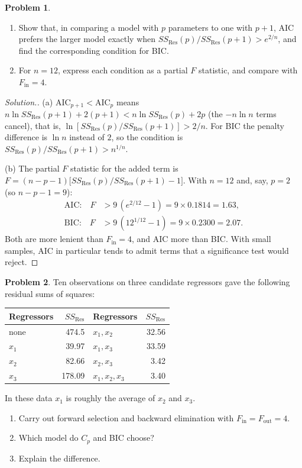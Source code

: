 \documentclass[11pt,a4paper]{article}
\numberwithin{equation}{section}
\theoremstyle{definition}
\newtheorem{problemx}{Problem}[subsection]
\newenvironment{problem}{\begin{problemx}}{\end{problemx}}
\newenvironment{solution}
  {\renewcommand{\qedsymbol}{}\begin{proof}[\textit{Solution}.]}
  {\end{proof}}
\begin{document}
\begin{problem}\label{prob:aic-bic}
\begin{enumerate}[label=(\alph*)]
\item Show that, in comparing a model with $p$ parameters to one with $p + 1$, AIC prefers the larger
model exactly when $SS_{\mathrm{Res}}(p)/SS_{\mathrm{Res}}(p + 1) > e^{2/n}$, and find the corresponding condition
for BIC.
\item For $n = 12$, express each condition as a partial $F$ statistic, and compare with $F_{\mathrm{in}} = 4$.
\end{enumerate}
\end{problem}

\begin{solution}
(a) $\mathrm{AIC}_{p+1} < \mathrm{AIC}_p$ means $n\ln SS_{\mathrm{Res}}(p + 1) + 2(p + 1) < n\ln SS_{\mathrm{Res}}(p) + 2p$
(the $-n\ln n$ terms cancel), that is, $\ln[SS_{\mathrm{Res}}(p)/SS_{\mathrm{Res}}(p + 1)] > 2/n$. For BIC the penalty
difference is $\ln n$ instead of $2$, so the condition is $SS_{\mathrm{Res}}(p)/SS_{\mathrm{Res}}(p + 1) > n^{1/n}$.

(b) The partial $F$ statistic for the added term is
$F = (n - p - 1)\bigl[SS_{\mathrm{Res}}(p)/SS_{\mathrm{Res}}(p + 1) - 1\bigr]$. With $n = 12$ and, say, $p = 2$ (so
$n - p - 1 = 9$):
\begin{align*}
\text{AIC:}\quad F &> 9\,(e^{2/12} - 1) = 9 \times 0.1814 = 1.63, \\
\text{BIC:}\quad F &> 9\,(12^{1/12} - 1) = 9 \times 0.2300 = 2.07 .
\end{align*}
Both are more lenient than $F_{\mathrm{in}} = 4$, and AIC more than BIC. With small samples, AIC in
particular tends to admit terms that a significance test would reject.
\end{solution}

\begin{problem}\label{prob:fwd-bwd}
Ten observations on three candidate regressors gave the following residual sums of squares:
\begin{center}
\begin{tabular}{l|r||l|r}
Regressors & $SS_{\mathrm{Res}}$ & Regressors & $SS_{\mathrm{Res}}$ \\
\hline
none & 474.5 & $x_1, x_2$ & 32.56 \\
$x_1$ & 39.97 & $x_1, x_3$ & 33.59 \\
$x_2$ & 82.66 & $x_2, x_3$ & 3.42 \\
$x_3$ & 178.09 & $x_1, x_2, x_3$ & 3.40 \\
\end{tabular}
\end{center}
In these data $x_1$ is roughly the average of $x_2$ and $x_3$.
\begin{enumerate}[label=(\alph*)]
\item Carry out forward selection and backward elimination with $F_{\mathrm{in}} = F_{\mathrm{out}} = 4$.
\item Which model do $C_p$ and BIC choose?
\item Explain the difference.
\end{enumerate}
\end{problem}
\end{document}
